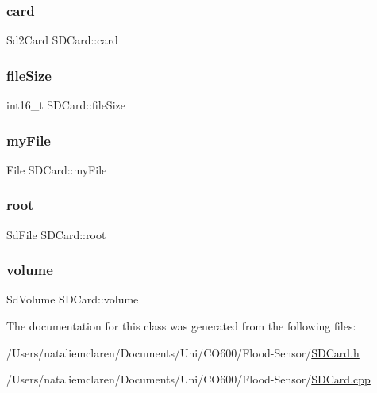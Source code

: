 \subsubsection{\texorpdfstring{card}{card}}
{\footnotesize\ttfamily Sd2\+Card S\+D\+Card\+::card}

\mbox{\label{class_s_d_card_aa6f7283f73936957a10fa7c65df5f57c}} 
\subsubsection{\texorpdfstring{file\+Size}{fileSize}}
{\footnotesize\ttfamily int16\+\_\+t S\+D\+Card\+::file\+Size}

\mbox{\label{class_s_d_card_a2e9756d5c5478bee2d7977a0c66ec47f}} 
\subsubsection{\texorpdfstring{my\+File}{myFile}}
{\footnotesize\ttfamily File S\+D\+Card\+::my\+File}

\mbox{\label{class_s_d_card_a6e02af8a10a45955da7c560ea148ca4d}} 
\subsubsection{\texorpdfstring{root}{root}}
{\footnotesize\ttfamily Sd\+File S\+D\+Card\+::root}

\mbox{\label{class_s_d_card_a143b4a79b09f0c1d6d71155b51dfefcb}} 
\subsubsection{\texorpdfstring{volume}{volume}}
{\footnotesize\ttfamily Sd\+Volume S\+D\+Card\+::volume}



The documentation for this class was generated from the following files\+:\begin{DoxyCompactItemize}
\item 
/\+Users/nataliemclaren/\+Documents/\+Uni/\+C\+O600/\+Flood-\/\+Sensor/\mbox{\hyperlink{_s_d_card_8h}{S\+D\+Card.\+h}}\item 
/\+Users/nataliemclaren/\+Documents/\+Uni/\+C\+O600/\+Flood-\/\+Sensor/\mbox{\hyperlink{_s_d_card_8cpp}{S\+D\+Card.\+cpp}}\end{DoxyCompactItemize}
